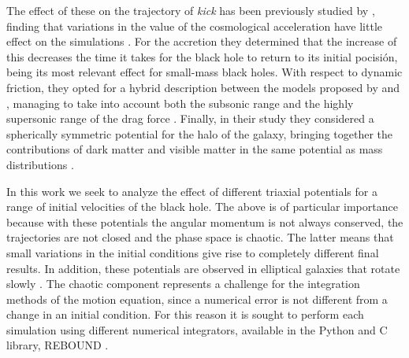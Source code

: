 	The effect of these on the trajectory of \textit{kick} has been previously studied by \citeauthor{choksi2017recoiling}, finding that variations in the value of the cosmological acceleration have little effect on the simulations \cite{choksi2017recoiling}. For the accretion they determined that the increase of this decreases the time it takes for the black hole to return to its initial pocisión, being its most relevant effect for small-mass black holes. With respect to dynamic friction, they opted for a hybrid description between the models proposed by \citeauthor{ostriker1999dynamical} and \citeauthor{escala2005role}, managing to take into account both the subsonic range and the highly supersonic range of the drag force \cite{ostriker1999dynamical, escala2005role}. Finally, in their study they considered a spherically symmetric potential for the halo of the galaxy, bringing together the contributions of dark matter and visible matter in the same potential as mass distributions \cite{choksi2017recoiling}.
	
	In this work we seek to analyze the effect of different triaxial potentials for a range of initial velocities of the black hole. The above is of particular importance because with these potentials the angular momentum is not always conserved, the trajectories are not closed and the phase space is chaotic. The latter means that small variations in the initial conditions give rise to completely different final results. In addition, these potentials are observed in elliptical galaxies that rotate slowly \cite{buote2002chandra, binney1978elliptical}. The chaotic component represents a challenge for the integration methods of the motion equation, since a numerical error is not different from a change in an initial condition. For this reason it is sought to perform each simulation using different numerical integrators, available in the Python and C library, REBOUND \cite{larson2017modeling}.
%	
%	
